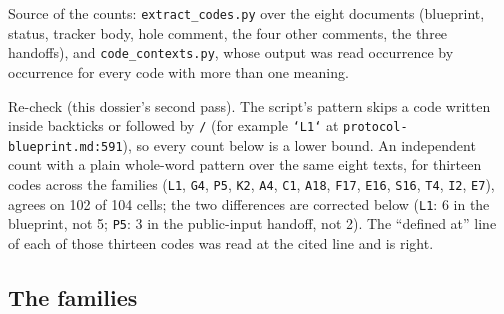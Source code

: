 \label{sec:docs-codes}

\begin{sloppypar}
Source of the counts: \texttt{extract\_\allowbreak{}codes.\allowbreak{}py} over the eight documents (blueprint, status, tracker body, hole comment, the four other comments, the three handoffs), and \texttt{code\_\allowbreak{}contexts.\allowbreak{}py}, whose output was read occurrence by occurrence for every code with more than one meaning.
\end{sloppypar}

\begin{sloppypar}
Re-check (this dossier's second pass). The script's pattern skips a code written inside backticks or followed by \texttt{/\allowbreak{}} (for example \texttt{`L1`} at \texttt{protocol-\allowbreak{}blueprint.\allowbreak{}md:\allowbreak{}591}), so every count below is a lower bound. An independent count with a plain whole-word pattern over the same eight texts, for thirteen codes across the families (\texttt{L1}, \texttt{G4}, \texttt{P5}, \texttt{K2}, \texttt{A4}, \texttt{C1}, \texttt{A18}, \texttt{F17}, \texttt{E16}, \texttt{S16}, \texttt{T4}, \texttt{I2}, \texttt{E7}), agrees on 102 of 104 cells; the two differences are corrected below (\texttt{L1}: 6 in the blueprint, not 5; \texttt{P5}: 3 in the public-input handoff, not 2). The ``defined at'' line of each of those thirteen codes was read at the cited line and is right.
\end{sloppypar}

\subsection{The families}\label{sec:docs-code-families}

